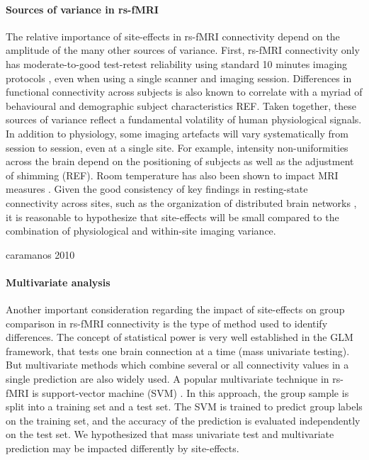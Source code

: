 \documentclass[authoryear]{elsarticle}
\begin{document}
\paragraph{Sources of variance in rs-fMRI}
The relative importance of site-effects in rs-fMRI connectivity depend on the amplitude of the many other sources of variance. First, rs-fMRI connectivity only has moderate-to-good test-retest reliability using standard 10 minutes imaging protocols \citep{Shehzad2009}, even when using a single scanner and imaging session. Differences in functional connectivity across subjects is also known to correlate with a myriad of behavioural and demographic subject characteristics REF. Taken together, these sources of variance reflect a fundamental volatility of human physiological signals. In addition to physiology, some imaging artefacts will vary systematically from session to session, even at a single site. For example, intensity non-uniformities across the brain depend on the positioning of subjects as well as the adjustment of shimming (REF). Room temperature has also been shown to impact MRI measures \citep{Vanhoutte2006}. Given the good consistency of key findings in resting-state connectivity across sites, such as the organization of distributed brain networks \citep{Biswal2010}, it is reasonable to hypothesize that site-effects will be small compared to the combination of physiological and within-site imaging variance.

caramanos 2010 



\paragraph{Multivariate analysis}
Another important consideration regarding the impact of site-effects on group comparison in rs-fMRI connectivity is the type of method used to identify differences. The concept of statistical power is very well established in the GLM framework, that tests one brain connection at a time (mass univariate testing). But multivariate methods which combine several or all connectivity values in a single prediction are also widely used. A popular multivariate technique in rs-fMRI is support-vector machine (SVM) \citep{Cortes1995}. In this approach, the group sample is split into a training set and a test set. The SVM is trained to predict group labels on the training set, and the accuracy of the prediction is evaluated independently on the test set. We hypothesized that mass univariate test and multivariate prediction may be impacted differently by site-effects. 
\end{document}
